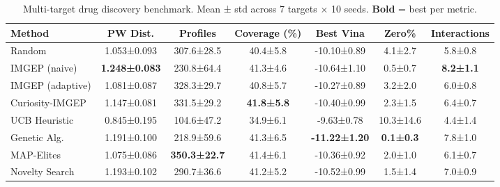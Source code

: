 \begin{table}[t]
\centering
\caption{Multi-target drug discovery benchmark. Mean ± std across 7 targets × 10 seeds. \textbf{Bold} = best per metric.}
\label{tab:main}
\begin{tabular}{lcccccc}
\toprule
Method & PW Dist. & Profiles & Coverage (\%) & Best Vina & Zero\% & Interactions \\
\midrule
Random & 1.053±0.093 & 307.6±28.5 & 40.4±5.8 & -10.10±0.89 & 4.1±2.7 & 5.8±0.8 \\
IMGEP (naive) & \textbf{1.248±0.083} & 230.8±64.4 & 41.3±4.6 & -10.64±1.10 & 0.5±0.7 & \textbf{8.2±1.1} \\
IMGEP (adaptive) & 1.081±0.087 & 328.3±29.7 & 40.8±5.7 & -10.27±0.89 & 3.2±2.0 & 6.0±0.8 \\
Curiosity-IMGEP & 1.147±0.081 & 331.5±29.2 & \textbf{41.8±5.8} & -10.40±0.99 & 2.3±1.5 & 6.4±0.7 \\
UCB Heuristic & 0.845±0.195 & 104.6±47.2 & 34.9±6.1 & -9.63±0.78 & 10.3±14.6 & 4.4±1.4 \\
Genetic Alg. & 1.191±0.100 & 218.9±59.6 & 41.3±6.5 & \textbf{-11.22±1.20} & \textbf{0.1±0.3} & 7.8±1.0 \\
MAP-Elites & 1.075±0.086 & \textbf{350.3±22.7} & 41.4±6.1 & -10.36±0.92 & 2.0±1.0 & 6.1±0.7 \\
Novelty Search & 1.193±0.102 & 290.7±36.6 & 41.2±5.2 & -10.52±0.99 & 1.5±1.4 & 7.0±0.9 \\
\bottomrule
\end{tabular}
\end{table}
